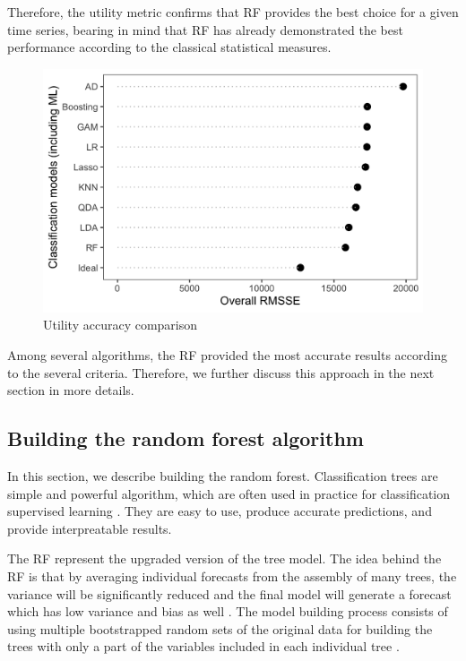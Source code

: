 \documentclass[preprint, 3p,
authoryear]{elsarticle} %
\begin{document}
Therefore, the utility metric confirms that RF provides the best choice
for a given time series, bearing in mind that RF has already
demonstrated the best performance according to the classical statistical
measures.

\begin{figure}[H]

{\centering \includegraphics[width=0.6\linewidth]{img/300dpi/utility} 

}

\caption{Utility accuracy comparison}\label{fig:tableCB}
\end{figure}

Among several algorithms, the RF provided the most accurate results
according to the several criteria. Therefore, we further discuss this
approach in the next section in more details.

\hypertarget{building-the-random-forest-algorithm}{%
\subsection{Building the random forest
algorithm}\label{building-the-random-forest-algorithm}}

In this section, we describe building the random forest. Classification
trees are simple and powerful algorithm, which are often used in
practice for classification supervised learning
\citep{friedman2001elements}. They are easy to use, produce accurate
predictions, and provide interpreatable results.

The RF represent the upgraded version of the tree model. The idea behind
the RF is that by averaging individual forecasts from the assembly of
many trees, the variance will be significantly reduced and the final
model will generate a forecast which has low variance and bias as well
\citep{friedman2001elements}. The model building process consists of
using multiple bootstrapped random sets of the original data for
building the trees with only a part of the variables included in each
individual tree \citep{breiman1996bagging}.
\end{document}
